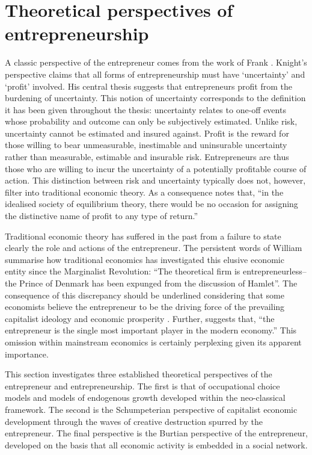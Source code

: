 \section{Theoretical perspectives of entrepreneurship}

A classic perspective of the entrepreneur comes from the work of Frank \citet{Knight1921}. Knight's perspective claims that all forms of entrepreneurship must have `uncertainty' and `profit' involved. His central thesis suggests that entrepreneurs profit from the burdening of uncertainty. This notion of uncertainty corresponds to the definition it has been given throughout the thesis: uncertainty relates to one-off events whose probability and outcome can only be subjectively estimated. Unlike risk, uncertainty cannot be estimated and insured against. Profit is the reward for those willing to bear unmeasurable, inestimable and uninsurable uncertainty rather than measurable, estimable and insurable risk. Entrepreneurs are thus those who are willing to incur the uncertainty of a potentially profitable course of action. This distinction between risk and uncertainty typically does not, however, filter into traditional economic theory. As a consequence \citet[p.~282]{Knight1935} notes that, ``in the idealised society of equilibrium theory, there would be no occasion for assigning the distinctive name of profit to any type of return.''

Traditional economic theory has suffered in the past from a failure to state clearly the role and actions of the entrepreneur. The persistent words of William \citet[p.~66]{Baumol1968} summarise how traditional economics has investigated this elusive economic entity since the Marginalist Revolution: ``The theoretical firm is entrepreneurless--the Prince of Denmark has been expunged from the discussion of Hamlet''. The consequence of this discrepancy should be underlined considering that some economists believe the entrepreneur to be the driving force of the prevailing capitalist ideology and economic prosperity \citep{Schmitz1989, WennekersThurik1999, Baumol2007}. Further, \citet[p.~1]{Lazear2002} suggests that, ``the entrepreneur is the single most important player in the modern economy.'' This omission within mainstream economics is certainly perplexing given its apparent importance. 

This section investigates three established theoretical perspectives of the entrepreneur and entrepreneurship. The first is that of occupational choice models and models of endogenous growth developed within the neo-classical framework. The second is the Schumpeterian perspective of capitalist economic development through the waves of creative destruction spurred by the entrepreneur. The final perspective is the Burtian perspective of the entrepreneur, developed on the basis that all economic activity is embedded in a social network.

